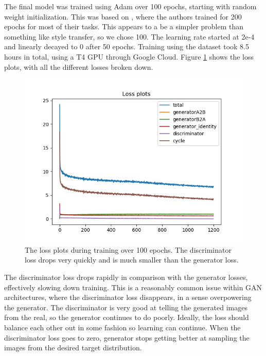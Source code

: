 \documentclass[10pt,twocolumn,letterpaper]{article}
\begin{document}
The final model was trained using Adam over 100 epochs, starting with random weight initialization. This was based on \cite{zhu2017unpaired}, where the authors trained for 200 epochs for most of their tasks. This appears to a be a simpler problem than something like style transfer, so we chose 100. The learning rate started at 2e-4 and linearly decayed to 0 after 50 epochs. Training using the dataset took 8.5 hours in total, using a T4 GPU through Google Cloud. Figure \ref{fig:lossplot} shows the loss plots, with all the different losses broken down. 
\begin{figure}[htpb]
    \includegraphics[width=.45\textwidth]{images/loss_plot.jpg}
    \caption{The loss plots during training over 100 epochs. The discriminator loss drops very quickly and is much smaller than the generator loss. }\label{fig:lossplot}
\end{figure}

The discriminator loss drops rapidly in comparison with the generator losses, effectively slowing down training. This is a reasonably common issue within GAN architectures, where the discriminator loss disappears, in a sense overpowering the generator. The discriminator is very good at telling the generated images from the real, so the generator continues to do poorly. Ideally, the loss should balance each other out in some fashion so learning can continue. When the discriminator loss goes to zero, generator stops getting better at sampling the images from the desired target distribution.
\end{document}
